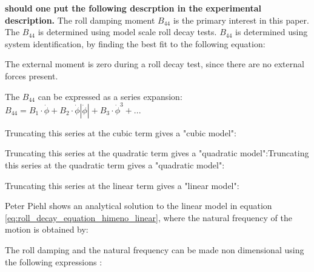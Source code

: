 \textbf{should one put the following descrption in the experimental description.}
The roll damping moment $B_{44}$ is the primary interest in this paper. The $B_{44}$ is determined using model scale roll decay tests. $B_{44}$ is determined using system identification, by finding the best fit to the following equation:

The external moment is zero during a roll decay test, since there are no external forces present.

The $B_{44}$ can be expressed as a series expansion:  
$ B_{44} = B_1\cdot\dot{\phi} + B_2\cdot\dot{\phi}\left|\dot{\phi}\right| + B_3\cdot\dot{\phi}^3 + ...$

Truncating this series at the cubic term gives a "cubic model":


Truncating this series at the quadratic term gives a "quadratic model":Truncating this series at the quadratic term gives a "quadratic model":


Truncating this series at the linear term gives a "linear model":


Peter Piehl \cite{henry_peter_piehl_ship_nodate} shows an analytical solution to the linear model in equation \ref{eq:roll_decay_equation_himeno_linear}, where the natural frequency of the motion is obtained by:


The roll damping and the natural frequency can be made non dimensional using the following expressions \cite{himeno_prediction_1981}: 



%



